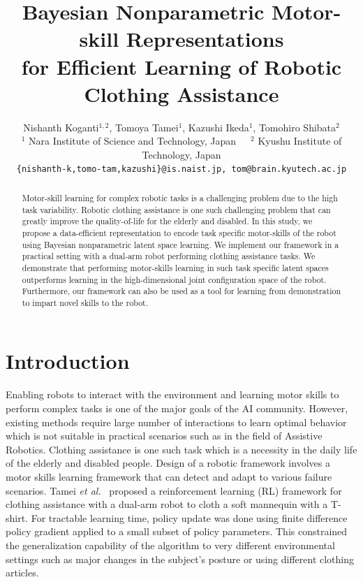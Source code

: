 \documentclass{article}
\title{Bayesian Nonparametric Motor-skill Representations \\ for Efficient Learning of Robotic Clothing Assistance}
\author{
  Nishanth Koganti$^{1,2}$, Tomoya Tamei$^{1}$, Kazushi Ikeda$^{1}$, Tomohiro Shibata$^{2}$\\
  $^1$ Nara Institute of Science and Technology, Japan~~~$^2$ Kyushu Institute of Technology, Japan\\
  \texttt{\{nishanth-k,tomo-tam,kazushi\}@is.naist.jp, tom@brain.kyutech.ac.jp} \\
}
\begin{document}
\maketitle

\begin{abstract}
Motor-skill learning for complex robotic tasks is a challenging problem due to the high task variability. Robotic clothing assistance is one such challenging problem that can greatly improve the quality-of-life for the elderly and disabled. In this study, we propose a data-efficient representation to encode task specific motor-skills of the robot using Bayesian nonparametric latent space learning. We implement our framework in a practical setting with a dual-arm robot performing clothing assistance tasks. We demonstrate that performing motor-skills learning in such task specific latent spaces outperforms learning in the high-dimensional joint configuration space of the robot. Furthermore, our framework can also be used as a tool for learning from demonstration to impart novel skills to the robot.
\end{abstract}

\section{Introduction}
\label{section:introduction}

Enabling robots to interact with the environment and learning motor skills to perform complex tasks is one of the major goals of the AI community. However, existing methods require large number of interactions to learn optimal behavior which is not suitable in practical scenarios such as in the field of Assistive Robotics. Clothing assistance is one such task which is a necessity in the daily life of the elderly and disabled people. Design of a robotic framework involves a motor skills learning framework that can detect and adapt to various failure scenarios. Tamei \emph{et al.}~\cite{tamei} proposed a reinforcement learning (RL) framework for clothing assistance with a dual-arm robot to cloth a soft mannequin with a T-shirt. For tractable learning time, policy update was done using finite difference policy gradient applied to a small subset of policy parameters. This constrained the generalization capability of the algorithm to very different environmental settings such as major changes in the subject's posture or using different clothing articles.
\end{document}
